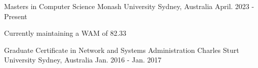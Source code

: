 

\begin{cventries}

  \cventry
    {Masters in Computer Science} %
    {Monash University} %
    {Sydney, Australia} %
    {April. 2023 - Present} %
   {
      \begin{cvitems} %
        \item {Currently maintaining a WAM of 82.33}
      \end{cvitems}
    }


  \cventry
    {Graduate Certificate in Network and Systems Administration} %
    {Charles Sturt University} %
    {Sydney, Australia} %
    {Jan. 2016 - Jan. 2017} %
   {
      \begin{cvitems} %
      \end{cvitems}
    }

\end{cventries}
